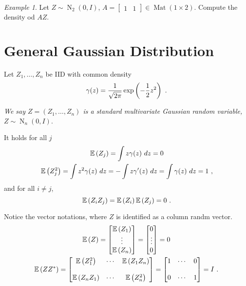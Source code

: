 \documentclass[12pt,a4paper]{amsart}
\newcommand{\MRof}[2]{\operatorname{Mat}\left(#1\times#2\right)}
\newcommand{\gaussian}[3]{\operatorname{N}_{#1}\left(#2,#3\right)}
\theoremstyle{plain}%
\theoremstyle{definition}
\theoremstyle{remark}
\newtheorem{example}{Example}
\begin{document}
\begin{example}
  Let $Z \sim \gaussian 2 0 I$, $A =
  \begin{bmatrix}
    1 & 1
  \end{bmatrix}
\in \MRof 1 2$. Compute the density od $AZ$.
\end{example}

\section{General Gaussian Distribution}
\label{sec:GGD}
Let $Z_1,\dots,Z_n$ be IID with common density\
\begin{equation*}
  \gamma(z) = \frac1{\sqrt{2\pi}} \exp\left(-\frac12 z^2\right) \ . 
\end{equation*}

\emph{We say $Z = (Z_1,\dots,Z_n)$ is a standard multivariate Gaussian
random variable, $Z \sim \gaussian n 0 I$}. 

It holds for all $j$
\begin{gather*}
  \operatorname{\mathbb E}\left(Z_j\right) = \int z \gamma(z) \ dz = 0
\\
  \operatorname{\mathbb E}\left(Z_j^2\right) = \int z ^2 \gamma(z) \ dz = - \int z \gamma'(z) \
  dz = \int \gamma(z) \ dz = 1 \ ,
\end{gather*}
and for all $i \neq j$,
\begin{equation*}
  \operatorname{\mathbb E}\left(Z_iZ_j\right) = \operatorname{\mathbb E}\left(Z_i\right) \operatorname{\mathbb E}\left(Z_j\right) = 0 \ .
\end{equation*}

Notice the vector notations, where $Z$ is identified as a column randm
vector.
\begin{gather*}
  \operatorname{\mathbb E}\left(Z\right) =
  \begin{bmatrix}
    \operatorname{\mathbb E}\left(Z_1\right) \\ \vdots \\ \operatorname{\mathbb E}\left(Z_n\right)
  \end{bmatrix}
=   \begin{bmatrix}
    0 \\ \vdots \\ 0
  \end{bmatrix}
= 0 \\
\operatorname{\mathbb E}\left(ZZ^*\right) =
\begin{bmatrix}
  \operatorname{\mathbb E}\left(Z_1^2\right) & \cdots & \operatorname{\mathbb E}\left(Z_1Z_n\right) \\
& \ \\
  \operatorname{\mathbb E}\left(Z_nZ_1\right) & \cdots & \operatorname{\mathbb E}\left(Z_n^2\right)
\end{bmatrix} =
\begin{bmatrix}
  1 & \cdots & 0 \\
& \ \\
  0 & \cdots & 1 
\end{bmatrix} = I \ . 
\end{gather*}
\end{document}
